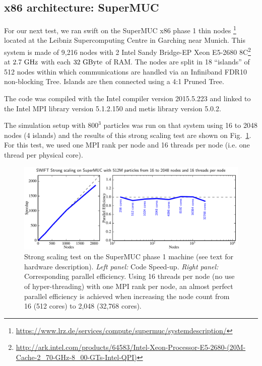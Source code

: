 \documentclass{sig-alternate-05-2015}
\newcommand{\swift}{{\sc swift}\xspace}
\begin{document}
\subsection{x86 architecture: SuperMUC}

For our next test, we ran \swift on the SuperMUC x86 phase 1 thin
nodes \footnote{\url{https://www.lrz.de/services/compute/supermuc/systemdescription/}}
located at the Leibniz Supercomputing Centre in Garching near Munich. This
system is made of 9,216 nodes with 2 Intel Sandy Bridge-EP Xeon E5-2680
8C\footnote{\url{http://ark.intel.com/products/64583/Intel-Xeon-Processor-E5-2680-(20M-Cache-2_70-GHz-8_00-GTs-Intel-QPI)}}
at $2.7~\rm{GHz}$ with each $32~\rm{GByte}$ of RAM. The nodes are split in 18
``islands'' of 512 nodes within which communications are handled via an
Infiniband FDR10 non-blocking Tree. Islands are then connected using a 4:1
Pruned Tree.

The code was compiled with the Intel compiler version \textsc{2015.5.223} and
linked to the Intel MPI library version \textsc{5.1.2.150} and metis library
version \textsc{5.0.2}.

The simulation setup with $800^3$ particles was run on that system using 16 to
2048 nodes (4 islands) and the results of this strong scaling test are shown on
Fig.~\ref{fig:superMUC}. For this test, we used one MPI rank per node and 16
threads per node (i.e. one thread per physical core).

\begin{figure}[t]
\centering
\includegraphics[width=\textwidth]{Figures/scalingSuperMUC}
\caption{Strong scaling test on the SuperMUC phase 1 machine (see text
  for hardware description). \textit{Left panel:} Code
  Speed-up. \textit{Right panel:} Corresponding parallel efficiency.
  Using 16 threads per node (no use of hyper-threading) with one MPI rank
  per node, an almost perfect parallel efficiency is achieved when
  increasing the node count from 16 (512 cores) to 2,048 (32,768
  cores).
  \label{fig:superMUC}}
\end{figure}
\end{document}
